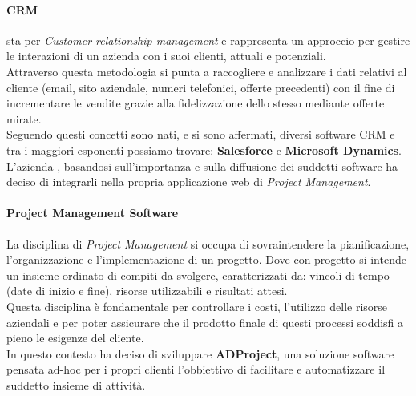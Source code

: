 \documentclass[12pt,a4paper,twoside,openright,english]{book}
\begin{document}
\paragraph*{CRM}
sta per \textit{Customer relationship management} e rappresenta un approccio per gestire le interazioni di un azienda con i suoi clienti, attuali e potenziali.\\
Attraverso questa metodologia si punta a raccogliere e analizzare i dati relativi al cliente (email, sito aziendale, numeri telefonici, offerte precedenti) con il fine di incrementare le vendite grazie alla fidelizzazione dello stesso mediante offerte mirate.\\
Seguendo questi concetti sono nati, e si sono affermati, diversi software CRM e tra i maggiori esponenti possiamo trovare: \textbf{Salesforce} e \textbf{Microsoft Dynamics}.\\
L'azienda \large{\myCompany{}}, basandosi sull'importanza e sulla diffusione dei suddetti software ha deciso di integrarli nella propria applicazione web di \textit{Project Management}.
 
\paragraph*{Project Management Software}
La disciplina di \textit{Project Management} si occupa di sovraintendere la pianificazione, l'organizzazione e l'implementazione di un progetto. Dove con progetto si intende un insieme ordinato di compiti da svolgere, caratterizzati da: vincoli di tempo (date di inizio e fine), risorse utilizzabili e risultati attesi.\\
Questa disciplina è fondamentale per controllare i costi, l'utilizzo delle risorse aziendali e per poter assicurare che il prodotto finale di questi processi soddisfi a pieno le esigenze del cliente.\\
In questo contesto \large{\myCompany{}} ha deciso di sviluppare \textbf{ADProject}, una soluzione software pensata ad-hoc per i propri clienti
l'obbiettivo di facilitare e automatizzare il suddetto insieme di attività.


\tableofcontents
\listoffigures
\listoftables

\mainmatter

\end{document}
